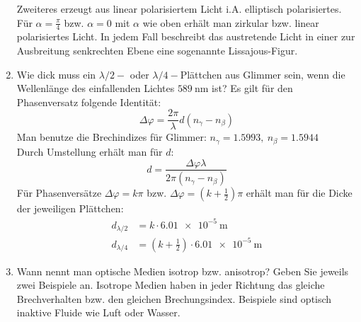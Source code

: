 \begin{enumerate}
		Zweiteres erzeugt aus linear polarisiertem Licht i.A. elliptisch polarisiertes. Für $\alpha=\frac{\pi}{4}$ bzw. $\alpha=0$ mit $\alpha$ wie oben erhält man zirkular bzw. linear polarisiertes Licht. In jedem Fall beschreibt das austretende Licht in einer zur Ausbreitung senkrechten Ebene eine sogenannte Lissajous-Figur.
	\item Wie dick muss ein $\lambda/2-$ oder $\lambda/4-$Plättchen aus Glimmer sein, wenn die Wellenlänge des einfallenden Lichtes $\SI{589}{\nano\meter}$ ist?
		\subitem Es gilt für den Phasenversatz folgende Identität:
		\begin{displaymath}
			\Delta\varphi=\frac{2\pi}{\lambda}d(n_\gamma-n_\beta)
		\end{displaymath}
		Man benutze die Brechindizes für Glimmer: $n_\gamma=1.5993,~n_\beta=1.5944$\\
		Durch Umstellung erhält man für $d$:
		\begin{displaymath}
			d=\frac{\Delta\varphi\lambda}{2\pi(n_\gamma-n_\beta)}
		\end{displaymath}
		Für Phasenversätze $\Delta\varphi=k\pi$ bzw. $\Delta\varphi=(k+\frac{1}{2})\pi$ erhält man für die Dicke der jeweiligen Plättchen:
		\begin{align*}
			d_{\lambda/2}&=k\cdot\SI{6.01e-5}{\meter}\\
			d_{\lambda/4}&=(k+\frac{1}{2})\cdot\SI{6.01e-5}{\meter}
		\end{align*}
	\item Wann nennt man optische Medien isotrop bzw. anisotrop? Geben Sie jeweils zwei Beispiele an.
		\subitem Isotrope Medien haben in jeder Richtung das gleiche Brechverhalten bzw. den gleichen Brechungsindex. Beispiele sind optisch inaktive Fluide wie Luft oder Wasser.
		

\end{enumerate}
